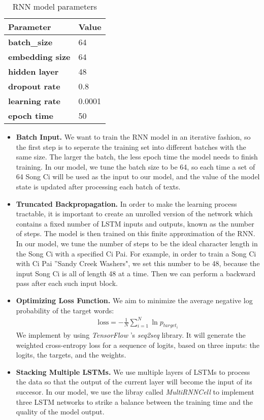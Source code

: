\begin{table}[htpb]
\centering
\caption{RNN model parameters}
\label{table:rnn}
\begin{tabular}{|l|l|}
\hline
\textbf{Parameter}      & \textbf{Value} \\ \hline
\textbf{batch\_size}    & 64             \\ \hline
\textbf{embedding size} & 64             \\ \hline
\textbf{hidden layer}   & 48             \\ \hline
\textbf{dropout rate}   & 0.8            \\ \hline
\textbf{learning rate}  & 0.0001         \\ \hline
\textbf{epoch time}     & 50             \\ \hline
\end{tabular}
\end{table}

\begin{itemize}
\item \textbf{Batch Input.} We want to train the RNN model in an iterative fashion, so the first step is to seperate the training set into different batches with the same size. The larger the batch, the less epoch time the model needs to finish training. In our model, we tune the batch size to be 64, so each time a set of 64 Song Ci will be used as the input to our model, and the value of the model state is updated after processing each batch of texts.

\item \textbf{Truncated Backpropagation.} In order to make the learning process tractable, it is important to create an unrolled version of the network which contains a fixed number of LSTM inputs and outputs, known as the number of steps. The model is then trained on this finite approximation of the RNN. 
%
In our model, we tune the number of steps to be the ideal character length in the Song Ci with a specified Ci Pai. For example, in order to train a Song Ci with Ci Pai ''Sandy Creek Washers", we set this number to be 48, because the input Song Ci is all of length 48 at a time.
%
Then we can perform a backward pass after each such input block.

\item \textbf{Optimizing Loss Function.} We aim to minimize the average negative log probability of the target words: 
\begin{align*}
\text{loss} = -\frac{1}{N} \sum_{i=1}^{N} \ln p_{target_i}
\end{align*}
We implement by using \emph{TensorFlow} 's \emph{seq2seq} library. It will generate the weighted cross-entropy loss for a sequence of logits, based on three inputs: the logits, the targets, and the weights. 

 
\item \textbf{Stacking Multiple LSTMs.} We  use multiple layers of LSTMs to process the data so that the output of the current layer will become the input of its succesor.
%
In our model,  we use the libray called \emph{MultiRNNCell} to implement three LSTM networks to strike a balance between the training time and the quality of the model output.
\end{itemize}

